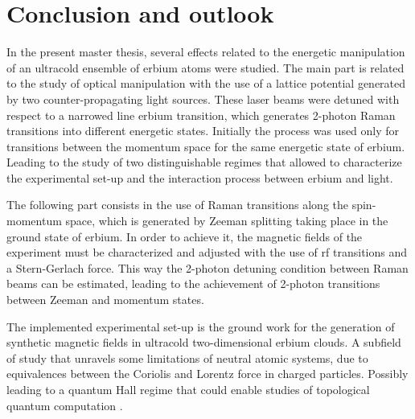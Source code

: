 
\chapter{Conclusion and outlook}
\label{chap:outlook}

In the present master thesis, several effects related to the energetic manipulation of an ultracold ensemble of erbium atoms were studied. The main part is related to the study of optical manipulation with the use of a lattice potential generated by two counter-propagating light sources. These laser beams were detuned with respect to a narrowed line erbium transition, which generates 2-photon Raman transitions into different energetic states. Initially the process was used only for transitions between the momentum space for the same energetic state of erbium. Leading to the study of two distinguishable regimes that allowed to characterize the experimental set-up and the interaction process between erbium and light.

The following part consists in the use of Raman transitions along the spin-momentum space, which is generated by Zeeman splitting taking place in the ground state of erbium. In order to achieve it, the magnetic fields of the experiment must be characterized and adjusted with the use of \Acl{rf} transitions and a Stern-Gerlach force. This way the 2-photon detuning condition between Raman beams can be estimated, leading to the achievement of 2-photon transitions between Zeeman and momentum states.

The implemented experimental set-up is the ground work for the generation of synthetic magnetic fields in ultracold two-dimensional erbium clouds. A subfield of study that unravels some limitations of neutral atomic systems, due to equivalences between the Coriolis and Lorentz force in charged particles. Possibly leading to a quantum Hall regime that could enable studies of topological quantum computation \cite{Lin2009}.



